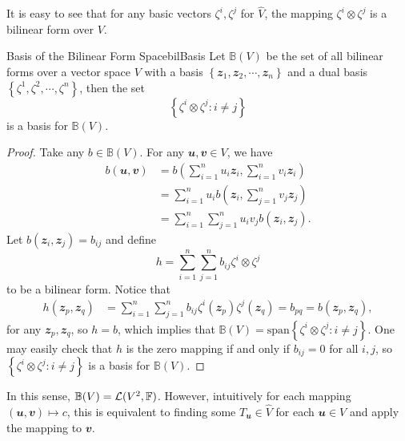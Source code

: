 \documentclass[math, code]{amznotes}
\theoremstyle{remark}
\begin{document}
It is easy to see that for any basic vectors $\zeta^i, \zeta^j$ for $\widehat{V}$, the mapping $\zeta^i \otimes \zeta^j$ is a bilinear form over $V$.
\begin{probox}{Basis of the Bilinear Form Space}{bilBasis}
    Let $\mathbb{B}(V)$ be the set of all bilinear forms over a vector space $V$ with a basis $\left\{\mathbfit{z}_1, \mathbfit{z}_2, \cdots, \mathbfit{z}_n\right\}$ and a dual basis $\left\{\zeta^1, \zeta^2, \cdots, \zeta^n\right\}$, then the set 
    \begin{equation*}
        \left\{\zeta^i \otimes \zeta^j \colon i \neq j \right\}
    \end{equation*}
    is a basis for $\mathbb{B}(V)$.
    \tcblower
    \begin{proof}
        Take any $b \in \mathbb{B}(V)$. For any $\mathbfit{u}, \mathbfit{v} \in V$, we have 
        \begin{align*}
            b(\mathbfit{u}, \mathbfit{v}) & = b\left(\sum_{i = 1}^{n}u_i\mathbfit{z}_i, \sum_{i = 1}^{n}v_i\mathbfit{z}_i\right) \\
            & = \sum_{i = 1}^{n}u_ib\left(\mathbfit{z}_i, \sum_{j = 1}^{n}v_j\mathbfit{z}_j\right) \\
            & = \sum_{i = 1}^{n}\sum_{j = 1}^{n}u_iv_jb\left(\mathbfit{z}_i, \mathbfit{z}_j\right).
        \end{align*}
        Let $b\left(\mathbfit{z}_i, \mathbfit{z}_j\right) = b_{ij}$ and define 
        \begin{equation*}
            h = \sum_{i = 1}^{n}\sum_{j = 1}^{n}b_{ij}\zeta^i \otimes \zeta^j
        \end{equation*}
        to be a bilinear form. Notice that 
        \begin{align*}
            h\left(\mathbfit{z}_p, \mathbfit{z}_q\right) & = \sum_{i = 1}^{n}\sum_{j = 1}^{n}b_{ij}\zeta^i\left(\mathbfit{z}_p\right)\zeta^j\left(\mathbfit{z}_q\right) = b_{pq} = b\left(\mathbfit{z}_p, \mathbfit{z}_q\right),
        \end{align*}
        for any $\mathbfit{z}_p, \mathbfit{z}_q$, so $h = b$, which implies that $\mathbb{B}(V) = \mathrm{span}\left\{\zeta^i \otimes \zeta^j \colon i \neq j \right\}$. One may easily check that $h$ is the zero mapping if and only if $b_{ij} = 0$ for all $i, j$, so $\left\{\zeta^i \otimes \zeta^j \colon i \neq j \right\}$ is a basis for $\mathbb{B}(V)$.
    \end{proof}
\end{probox}
In this sense, $\mathbb{B}(V) = \mathcal{L}(V^2, \mathbb{F})$. However, intuitively for each mapping $(\mathbfit{u}, \mathbfit{v}) \mapsto c$, this is equivalent to finding some $T_{\mathbfit{u}} \in \widehat{V}$ for each $\mathbfit{u} \in V$ and apply the mapping to $\mathbfit{v}$.
\end{document}
